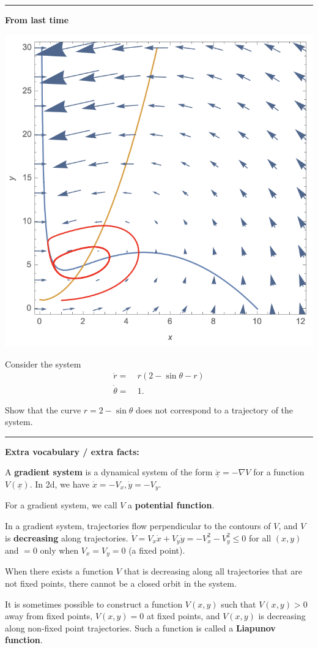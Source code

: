 \documentclass[12pt,letterpaper,noanswers]{exam}
\begin{document}
\vspace{0.2cm}
\hrule
\vspace{0.2cm}

\noindent\textbf{From last time}

\includegraphics[scale=0.7]{img/C14trappingp1.png}

Consider the system 
\begin{align*}
\dot{r} = &\  r(2-\sin\theta -r) \\
\dot{\theta} = &\ 1.
\end{align*}

Show that the curve $r = 2-\sin\theta$ does not correspond to a trajectory of the system.

\vspace{0.2cm}
\hrule
\vspace{0.2cm}


\noindent \textbf{Extra vocabulary / extra facts:}
\begin{tcolorbox}
A \textbf{gradient system} is a dynamical system of the form $\dot{\underline{x}} = -\nabla V$ for a function $V(\underline{x})$.  In 2d, we have $\dot x = -V_x, \dot y = -V_y$.

For a gradient system, we call $V$ a \textbf{potential function}.

In a gradient system, trajectories flow perpendicular to the contours of $V$, and $V$ is \textbf{decreasing} along trajectories.  $\dot V = V_x \dot x + V_y \dot y = -V_x^2-V_y^2 \leq 0$ for all $(x,y)$ and $=0$ only when $V_x = V_y = 0$ (a fixed point).

When there exists a function $V$ that is decreasing along all trajectories that are not fixed points, there cannot be a closed orbit in the system.

It is sometimes possible to construct a function $V(x,y)$ such that $V(x,y)>0$ away from fixed points, $V(x,y) = 0$ at fixed points, and $V(x,y)$ is decreasing along non-fixed point trajectories.  Such a function is called a \textbf{Liapunov function}.
\end{tcolorbox}
\end{document}
